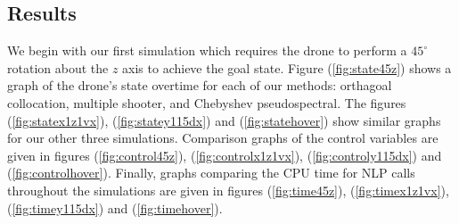 \documentclass[]{article}
\begin{document}
\subsection*{Results}
We begin with our first simulation which requires the drone to perform a $45^{\circ}$ rotation about the $z$ axis to achieve the goal state. 
Figure (\ref{fig:state45z}) shows a graph of the drone's state overtime for each of our methods: orthagoal collocation, multiple shooter, and Chebyshev pseudospectral. The figures  (\ref{fig:statex1z1vx}), (\ref{fig:statey115dx}) and (\ref{fig:statehover}) show similar graphs for our other three simulations.  Comparison graphs of the control variables are given in figures (\ref{fig:control45z}), (\ref{fig:controlx1z1vx}), (\ref{fig:controly115dx}) and (\ref{fig:controlhover}). Finally, graphs comparing the CPU time for NLP calls throughout the simulations are given in figures (\ref{fig:time45z}), (\ref{fig:timex1z1vx}), (\ref{fig:timey115dx}) and (\ref{fig:timehover}). 
 
\end{document}
